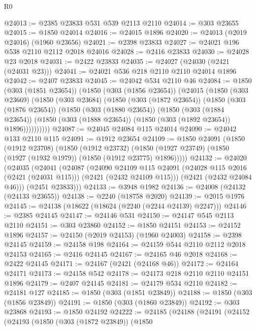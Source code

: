 \begin{lexlean}{R0}
\begin{coremodule}
@24013 := @2385 @23833 @531 @539 @2113 @2110
@24014 := @303 @23655
@24015 := @1850 @24014
@24016 := @24015 @1896
@24020 := @24013 (@2019 @24016) (@1960 @23656)
@24021 := @2398 @23833
@24027 := @24021 @196 @538 @2110 @2112 @2018 @24016
@24028 := @2416 @23833
@24030 := @24028 @23 @2018
@24031 := @2422 @23833
@24035 := @24027 (@24030 (@2421 (@24031 @23)))
@24041 := @24021 @536 @218 @2110 @2110 @24014 @1896
@24042 := @2407 @23833
@24045 := @24042 @534 @2110 @46
@24084 := @1850
    (@303 (@1851 @23654))
    (@1850
      (@303 (@1856 @23654))
      (@24015
        (@1850
          (@303 @23669)
          (@1850
            (@303 @23684)
            (@1850
              (@303 (@1872 @23654))
              (@1850
                (@303 (@1876 @23654))
                (@1850
                  (@303 (@1880 @23654))
                  (@1850
                    (@303 (@1884 @23654))
                    (@1850 (@303 (@1888 @23654)) (@1850 (@303 (@1892 @23654)) @1896))))))))))
@24087 := @24045 @24084 @115 @24014
@24090 := @24042 @133 @2110 @115
@24091 := @1912 @23654
@24109 := @1850
    @24091
    (@1850
      (@1912 @23708)
      (@1850
        (@1912 @23732)
        (@1850 (@1927 @23749) (@1850 (@1927 (@1932 @1979)) (@1850 (@1912 @23775) @1896)))))
@24132 := @24020
    (@24035
      (@24041
        (@24087
          (@24090
            @24109
            @115
            @24091
            (@24028 @115 @2016 (@2421 (@24031 @115)))
            (@2421 (@2432 @24109 @115)))
          (@2421 (@2432 @24084 @46)))
        (@2451 @23833)))
@24133 := @3948 @1982
@24136 := @24008 (@24132 (@24133 @23655))
@24138 := @2240 (@18758 @2020)
@24139 := @2015 @1976
@24145 := @24138 (@18622 (@18624 (@2240 (@2244 @24139) @2247)))
@24146 := @2385 @24145
@24147 := @24146 @531
@24150 := @24147 @545 @2113 @2110
@24151 := @303 @23860
@24152 := @1850 @24151
@24153 := @24152 @1896
@24157 := @24150 (@2019 @24153) (@1960 @24003)
@24158 := @2398 @24145
@24159 := @24158 @198
@24164 := @24159 @544 @2110 @2112 @2018 @24153
@24165 := @2416 @24145
@24167 := @24165 @46 @2018
@24168 := @2422 @24145
@24171 := @24167 (@2421 (@24168 @46))
@24172 := @24164 @24171
@24173 := @24158 @542
@24178 := @24173 @218 @2110 @2110 @24151 @1896
@24179 := @2407 @24145
@24181 := @24179 @534 @2110
@24182 := @24181 @127
@24185 := @1850 (@303 (@1851 @23849))
@24188 := @1850 (@303 (@1856 @23849))
@24191 := @1850 (@303 (@1860 @23849))
@24192 := @303 @23868
@24193 := @1850 @24192
@24222 := @24185
    (@24188
      (@24191
        (@24152
          (@24193
            (@1850
              (@303 (@1872 @23849))
              (@1850

\end{coremodule}
\end{lexlean}
